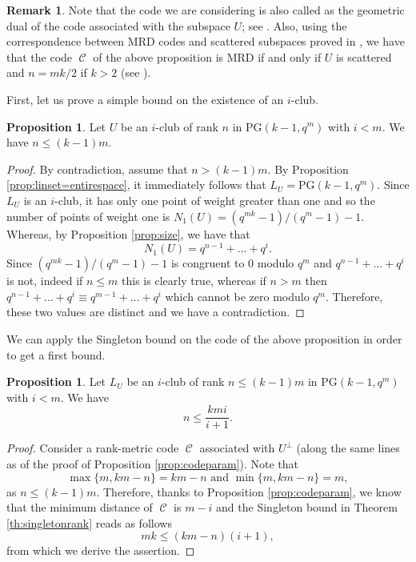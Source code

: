 \documentclass[11pt]{amsart}
\DeclareMathOperator{\C}{\mathcal{C}}
\theoremstyle{definition}
\newtheorem{proposition}[theorem]{Proposition}
\newtheorem{remark}[theorem]{Remark}
\begin{document}
\begin{remark}
    Note that the code we are considering is also called as the geometric dual of the code associated with the subspace $U$; see \cite{BoreZull0}.
    Also, using the correspondence between MRD codes and scattered subspaces proved in \cite{zini2021scattered}, we have that the code $\C$ of the above proposition is MRD if and only if $U$ is scattered and $n=mk/2$ if $k>2$ (see \cite{zini2021scattered,marino2023evasive}).
\end{remark}

First, let us prove a simple bound on the existence of an $i$-club.

\begin{proposition}\label{prop:genbound}
    Let $U$ be an $i$-club of rank $n$ in PG$(k-1,q^m)$ with $i<m$. We have $n\leq (k-1)m$.
\end{proposition}
\begin{proof}
    By contradiction, assume that $n>(k-1)m$. By Proposition \ref{prop:linset=entirespace}, it immediately follows that $L_U=\mathrm{PG}(k-1,q^m)$.
    Since $L_U$ is an $i$-club, it has only one point of weight greater than one and so the number of points of weight one is $N_1(U)=(q^{mk}-1)/(q^m-1)-1$.
    Whereas, by Proposition \ref{prop:size}, we have that
    \[ N_1(U)=q^{n-1}+\ldots+q^i. \]
    Since $(q^{mk}-1)/(q^m-1)-1$ is congruent to $0$ modulo $q^m$ and $q^{n-1}+\ldots+q^i$ is not, indeed if $n\leq m$ this is clearly true, whereas if $n>m$ then $q^{n-1}+\ldots+q^i \equiv q^{m-1}+\ldots+q^i$ which cannot be zero modulo $q^m$. Therefore, these two values are distinct and we have a contradiction.
\end{proof}

We can apply the Singleton bound on the code of the above proposition in order to get a first bound.

\begin{proposition}
    Let $L_U$ be an $i$-club of rank $n\leq (k-1)m$ in PG$(k-1,q^m)$ with $i<m$. We have
    \[ n\leq \frac{kmi}{i+1}. \]
\end{proposition}
\begin{proof}
    Consider a rank-metric code $\C$ associated with $U^\perp$ (along the same lines as of the proof of Proposition \ref{prop:codeparam}). Note that 
    \[ \max\{ m,km-n \}=km-n\,\,\text{and}\,\,\min\{ m,km-n \}=m, \]
    as $n\leq (k-1)m$.
    Therefore, thanks to Proposition \ref{prop:codeparam}, we know that the minimum distance of $\C$ is $m-i$ and the Singleton bound in Theorem \ref{th:singletonrank} reads as follows
    \[ mk\leq (km-n)(i+1), \]
    from which we derive the assertion.
\end{proof}
\end{document}
